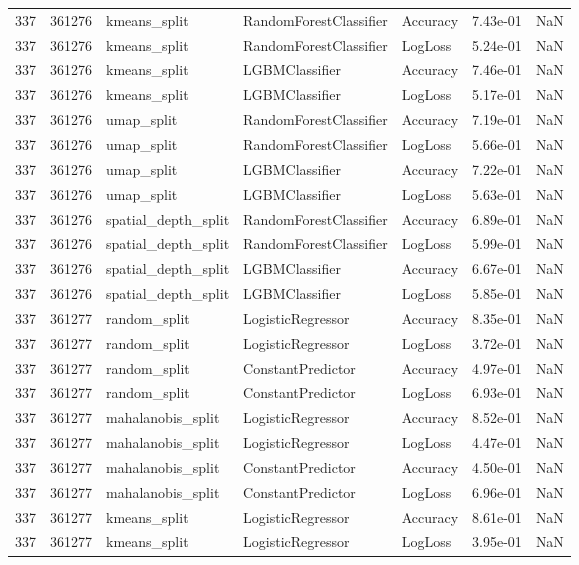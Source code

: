 \begin{tabular}{rrlllrr}
337 & 361276 & kmeans\_split & RandomForestClassifier & Accuracy & 7.43e-01 & NaN \\
337 & 361276 & kmeans\_split & RandomForestClassifier & LogLoss & 5.24e-01 & NaN \\
337 & 361276 & kmeans\_split & LGBMClassifier & Accuracy & 7.46e-01 & NaN \\
337 & 361276 & kmeans\_split & LGBMClassifier & LogLoss & 5.17e-01 & NaN \\
337 & 361276 & umap\_split & RandomForestClassifier & Accuracy & 7.19e-01 & NaN \\
337 & 361276 & umap\_split & RandomForestClassifier & LogLoss & 5.66e-01 & NaN \\
337 & 361276 & umap\_split & LGBMClassifier & Accuracy & 7.22e-01 & NaN \\
337 & 361276 & umap\_split & LGBMClassifier & LogLoss & 5.63e-01 & NaN \\
337 & 361276 & spatial\_depth\_split & RandomForestClassifier & Accuracy & 6.89e-01 & NaN \\
337 & 361276 & spatial\_depth\_split & RandomForestClassifier & LogLoss & 5.99e-01 & NaN \\
337 & 361276 & spatial\_depth\_split & LGBMClassifier & Accuracy & 6.67e-01 & NaN \\
337 & 361276 & spatial\_depth\_split & LGBMClassifier & LogLoss & 5.85e-01 & NaN \\
337 & 361277 & random\_split & LogisticRegressor & Accuracy & 8.35e-01 & NaN \\
337 & 361277 & random\_split & LogisticRegressor & LogLoss & 3.72e-01 & NaN \\
337 & 361277 & random\_split & ConstantPredictor & Accuracy & 4.97e-01 & NaN \\
337 & 361277 & random\_split & ConstantPredictor & LogLoss & 6.93e-01 & NaN \\
337 & 361277 & mahalanobis\_split & LogisticRegressor & Accuracy & 8.52e-01 & NaN \\
337 & 361277 & mahalanobis\_split & LogisticRegressor & LogLoss & 4.47e-01 & NaN \\
337 & 361277 & mahalanobis\_split & ConstantPredictor & Accuracy & 4.50e-01 & NaN \\
337 & 361277 & mahalanobis\_split & ConstantPredictor & LogLoss & 6.96e-01 & NaN \\
337 & 361277 & kmeans\_split & LogisticRegressor & Accuracy & 8.61e-01 & NaN \\
337 & 361277 & kmeans\_split & LogisticRegressor & LogLoss & 3.95e-01 & NaN \\

\end{tabular}
